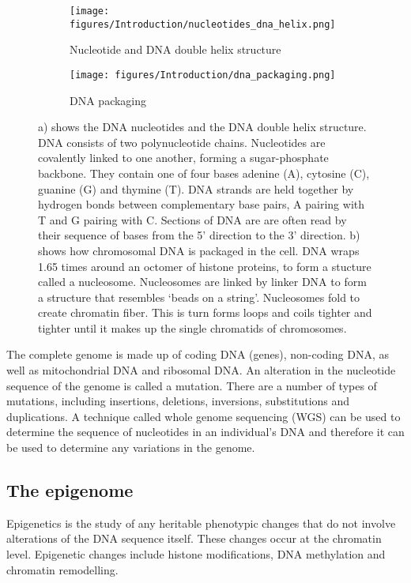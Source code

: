 \begin{figure}[htb]
\begin{subfigure}[t]{0.5\textwidth}
    \texttt{[image: figures/Introduction/nucleotides\_dna\_helix.png]}
    \caption{Nucleotide and DNA double helix structure}
    \label{fig:base_pairs}
\end{subfigure}
\begin{subfigure}[t]{0.5\textwidth}
    \texttt{[image: figures/Introduction/dna\_packaging.png]}
    \caption{DNA packaging}
    \label{fig:DNA_packaging}
\end{subfigure}
    \caption[DNA stucture and packaging.]{a) shows the DNA nucleotides and the DNA double helix structure.
    DNA consists of two polynucleotide chains.
    Nucleotides are covalently linked to one another, forming a sugar-phosphate backbone.
    They contain one of four bases adenine (A), cytosine (C), guanine (G) and thymine (T).
    DNA strands are held together by hydrogen bonds between complementary base pairs, A pairing with T and G pairing with C\@.
    Sections of DNA are are often read by their sequence of bases from the 5' direction to the 3' direction.
    b) shows how chromosomal DNA is packaged in the cell.
    DNA wraps 1.65 times around an octomer of histone proteins, to form a stucture called a nucleosome.
    Nucleosomes are linked by linker DNA to form a structure that resembles `beads on a string'.
    Nucleosomes fold to create chromatin fiber.
    This is turn forms loops and coils tighter and tighter until it makes up the single chromatids of chromosomes.
    }
\label{fig:DNA_structure_packaging}
\end{figure}

The complete genome is made up of coding DNA (genes), non-coding DNA, as well as mitochondrial DNA and ribosomal DNA\@.
An alteration in the nucleotide sequence of the genome is called a mutation.
There are a number of types of mutations, including insertions, deletions, inversions, substitutions and duplications.
A technique called whole genome sequencing (WGS) can be used to determine the sequence of nucleotides in an individual's DNA and therefore it can be used to determine any variations in the genome.

\subsection{The epigenome}
Epigenetics is the study of any heritable phenotypic changes that do not involve alterations of the DNA sequence itself.
These changes occur at the chromatin level.
Epigenetic changes include histone modifications, DNA methylation and chromatin remodelling.

